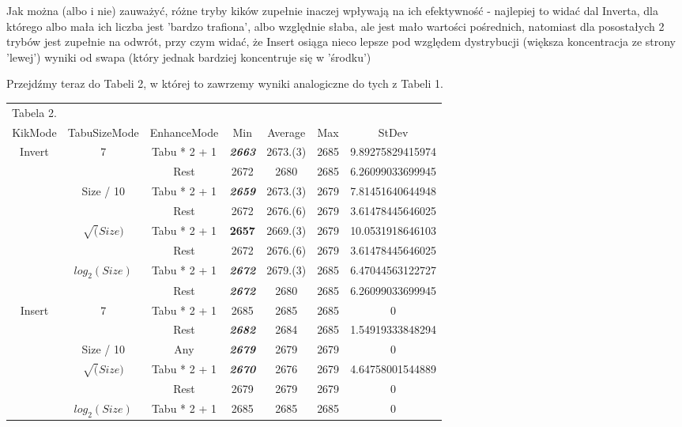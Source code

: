 \documentclass{article}
\begin{document}
Jak można (albo i nie) zauważyć, różne tryby kików zupełnie inaczej wpływają na ich efektywność - najlepiej to widać dal Inverta, dla którego albo mała ich liczba jest 'bardzo trafiona', albo względnie słaba, ale jest mało wartości pośrednich, natomiast dla posostałych 2 trybów jest zupełnie na odwrót, przy czym widać, że Insert osiąga nieco lepsze pod względem dystrybucji (większa koncentracja ze strony 'lewej') wyniki od swapa (który jednak bardziej koncentruje się w 'środku')

\newpage
Przejdźmy teraz do Tabeli 2, w której to zawrzemy wyniki analogiczne do tych z Tabeli 1.

\begin{table}[h!]
	\centering
	\begin{tabular}{c|c|c||c|c|c|c}
	Tabela 2.\\
KikMode & TabuSizeMode & EnhanceMode & Min & Average & Max & StDev \\
\hline
Invert & 7 & Tabu * 2 + 1 & \textbf{\textit{2663}} & 2673.(3) & 2685 & 9.89275829415974 \\
 &  & Rest & 2672 & 2680 & 2685 & 6.26099033699945 \\
\cline{2-7}
 & Size / 10 & Tabu * 2 + 1 & \textbf{\textit{2659}} & 2673.(3) & 2679 & 7.81451640644948 \\
 &  & Rest & 2672 & 2676.(6) & 2679 & 3.61478445646025 \\
\cline{2-7}
 & $\sqrt(Size)$ & Tabu * 2 + 1 & \textbf{2657} & 2669.(3) & 2679 & 10.0531918646103 \\
 &  & Rest & 2672 & 2676.(6) & 2679 & 3.61478445646025 \\
\cline{2-7}
 & $log_2(Size)$ & Tabu * 2 + 1 &  \textbf{\textit{2672}} & 2679.(3) & 2685 & 6.47044563122727 \\
 &  & Rest &  \textbf{\textit{2672}} & 2680 & 2685 & 6.26099033699945 \\
\hline
Insert & 7 & Tabu * 2 + 1 & 2685 & 2685 & 2685 & 0 \\
 &  & Rest &  \textbf{\textit{2682}} & 2684 & 2685 & 1.54919333848294 \\
\cline{2-7}
 & Size / 10 & Any &  \textbf{\textit{2679}} & 2679 & 2679 & 0 \\
\cline{2-7}
 & $\sqrt(Size)$ & Tabu * 2 + 1 &  \textbf{\textit{2670}} & 2676 & 2679 & 4.64758001544889 \\
 &  & Rest & 2679 & 2679 & 2679 & 0 \\
\cline{2-7}
 & $log_2(Size)$ & Tabu * 2 + 1 & 2685 & 2685 & 2685 & 0 \\

\end{tabular}
\end{table}
\end{document}
